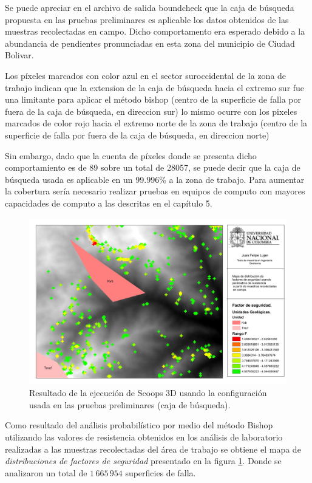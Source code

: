 Se puede apreciar en el archivo de salida boundcheck que la caja de b\'usqueda propuesta en las pruebas preliminares es aplicable los datos obtenidos de las muestras recolectadas en campo. Dicho comportamento era esperado debido a la abundancia de pendientes pronunciadas en esta zona del municipio de Ciudad Bolivar.

Los p\'ixeles marcados con color azul en el sector suroccidental de la zona de trabajo indican que la extension de la caja de b\'usqueda hacia el extremo sur fue una limitante para aplicar el m\'etodo bishop (centro de la superficie de falla por fuera de la caja de b\'usqueda, en direccion sur) lo mismo ocurre con los pixeles marcados de color rojo hacia el extremo norte de la zona de trabajo (centro de la superficie de falla por fuera de la caja de b\'usqueda, en direccion norte)

Sin embargo, dado que la cuenta de p\'ixeles donde se presenta dicho comportamiento es de 89 sobre un total de 28057, se puede decir que la caja de b\'usqueda usada es aplicable en un 99.996\% a la zona de trabajo.
Para aumentar la cobertura ser\'ia necesario realizar pruebas en equipos de computo con mayores capacidades de computo a las descritas en el cap\'itulo 5.


\begin{figure}[H]
\centering
\includegraphics[scale=0.3]{img/fos3DCampo_coarse.pdf}
\caption{Resultado  de la ejecuci\'on de Scoops 3D usando la configuraci\'on usada en las pruebas preliminares (caja de b\'usqueda).}
\label{fig:fos3dout_coarse}
\end{figure}


Como resultado del an\'alisis probabil\'istico por medio del m\'etodo Bishop utilizando las valores de resistencia obtenidos en los an\'alisis de laboratorio realizadas a las muestras recolectadas del \'area de trabajo se obtiene el mapa de \emph{distribuciones de factores de seguridad} presentado en la figura \ref{fig:fos3dout_coarse}.
Donde se analizaron un total de \(1\,665\,954\) superficies de falla.


